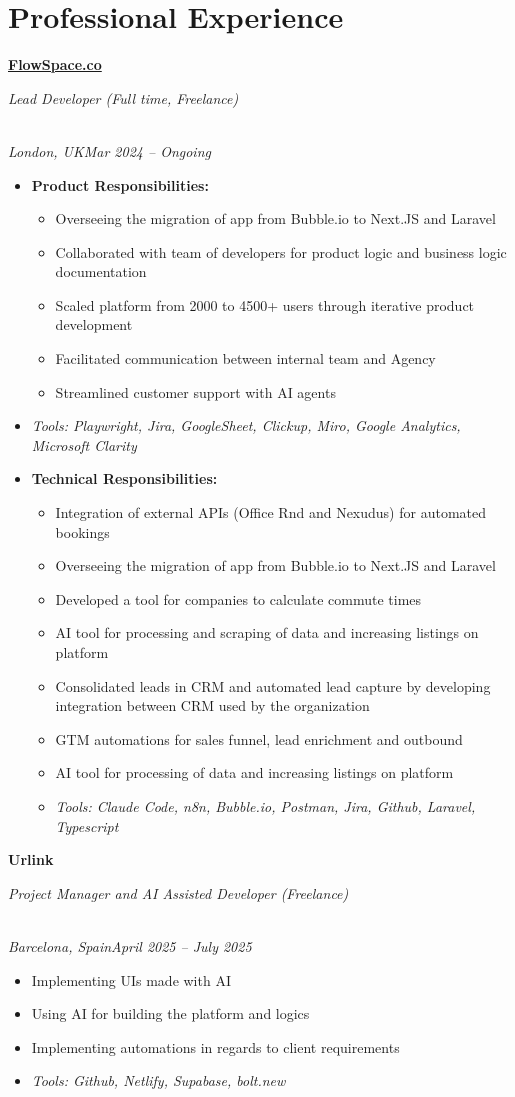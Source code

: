 \documentclass[a4paper,10pt]{article}
\newcommand{\role}[4]{\vspace{3pt}\noindent\hspace{0.6em}\parbox[t]{0.38\textwidth}{\raggedright\textbf{#1}}\hfill\parbox[t]{0.58\textwidth}{\raggedleft\textit{#2}}\\{\textit{#3}\hfill\textit{#4}}\vspace{1pt}}
\begin{document}
\section{Professional Experience}
\role{\href{https://flowspace.co}{FlowSpace.co}}{Lead Developer (Full time, Freelance)}{London, UK}{Mar 2024 -- Ongoing}
\begin{itemize}
\item \textbf{Product Responsibilities:}
\begin{itemize}[label=--]
\item Overseeing the migration of app from Bubble.io to Next.JS and Laravel
\item Collaborated with team of developers for product logic and business logic documentation
\item Scaled platform from 2000 to 4500+ users through iterative product development
\item Facilitated communication between internal team and Agency
\item Streamlined customer support with AI agents
\end{itemize}
\item \textit{Tools: Playwright, Jira, GoogleSheet, Clickup, Miro, Google Analytics, Microsoft Clarity}
\item \textbf{Technical Responsibilities:}
\begin{itemize}[label=--]
\item Integration of external APIs (Office Rnd and Nexudus) for automated bookings
\item Overseeing the migration of app from Bubble.io to Next.JS and Laravel
\item Developed a tool for companies to calculate commute times
\item AI tool for processing and scraping of data and increasing listings on platform
\item Consolidated leads in CRM and automated lead capture by developing integration between CRM used by the organization
\item GTM automations for sales funnel, lead enrichment and outbound
\item AI tool for processing of data and increasing listings on platform
\item \textit{Tools: Claude Code, n8n, Bubble.io, Postman, Jira, Github, Laravel, Typescript}
\end{itemize}
\end{itemize}

\role{Urlink}{Project Manager and AI Assisted Developer (Freelance)}{Barcelona, Spain}{April 2025 -- July 2025}
\begin{itemize}
\item Implementing UIs made with AI
\item Using AI for building the platform and logics
\item Implementing automations in regards to client requirements
\item \textit{Tools: Github, Netlify, Supabase, bolt.new}
\end{itemize}
\end{document}

